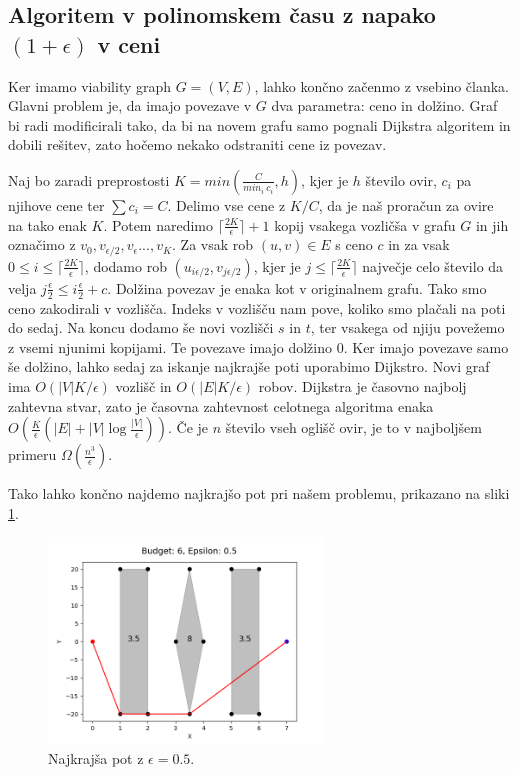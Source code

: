 \documentclass{article}
\begin{document}
\subsection*{Algoritem v polinomskem času z napako $(1+\epsilon)$ v ceni}

Ker imamo viability graph $G = (V,E)$, lahko končno začenmo z vsebino članka. Glavni problem je, da imajo povezave v $G$ dva parametra: ceno in dolžino.
Graf bi radi modificirali tako, da bi na novem grafu samo pognali Dijkstra algoritem in dobili rešitev, zato hočemo nekako odstraniti cene iz povezav. 

Naj bo  zaradi preprostosti $K = min(\frac{C}{min_i \ c_i}, h)$, kjer je $h$ število ovir, $c_i$ pa njihove cene ter $\sum c_i = C$. Delimo vse cene z $K/C$, da je naš proračun za ovire na tako enak $K$. Potem naredimo $ \lceil{\frac{2K}{\epsilon}}\rceil + 1$  kopij vsakega vozličša v grafu $G$ in jih označimo z $v_0, v_{\epsilon/2}, v_{\epsilon}..., v_K$. Za vsak rob $(u, v) \in E$ s ceno $c$ in za vsak $0 \le i \le \lceil{\frac{2K}{\epsilon}}\rceil $, dodamo rob $(u_{i \epsilon/2}, v_{j \epsilon/2})$, kjer je $j\le\lceil{\frac{2K}{\epsilon}}\rceil$ največje celo število da velja $j\frac{\epsilon}{2}
 \le i \frac{\epsilon}{2} + c$. Dolžina povezav je enaka kot v originalnem grafu. Tako smo ceno zakodirali v vozlišča. Indeks v vozlišču nam pove, koliko smo plačali na poti do sedaj. Na koncu dodamo še novi vozlišči $s$ in $t$, ter vsakega od njiju povežemo z vsemi njunimi kopijami. Te povezave imajo dolžino $0$. Ker imajo povezave samo še dolžino, lahko sedaj za iskanje najkrajše poti uporabimo Dijkstro. Novi graf ima $O(|V|K/\epsilon)$ vozlišč in $O(|E|K/\epsilon)$ robov. Dijkstra  je  časovno najbolj zahtevna stvar, zato je časovna zahtevnost celotnega algoritma enaka $O(\frac{K}{\epsilon}(|E| + |V|\log\frac{|V|}{\epsilon}) )$. Če je $n$ število vseh oglišč ovir, je to v najboljšem primeru $\Omega(\frac{n^3}{\epsilon})$.

 Tako lahko končno najdemo najkrajšo pot pri našem problemu, prikazano na sliki \ref{fig:errP1}.

 \begin{figure}[h]
    \centering
    \includegraphics[width=0.65\textwidth]{errPath1.png}
    \caption{Najkrajša pot z $\epsilon = 0.5$.}
    \label{fig:errP1}
\end{figure}
\end{document}
